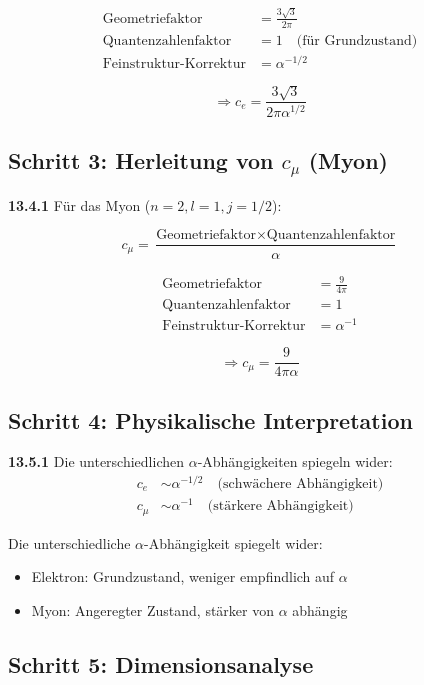 \begin{align*}
	\text{Geometriefaktor} &= \frac{3\sqrt{3}}{2\pi} \\
	\text{Quantenzahlenfaktor} &= 1 \quad \text{(für Grundzustand)} \\
	\text{Feinstruktur-Korrektur} &= \alpha^{-1/2}
\end{align*}

\[
\Rightarrow c_e = \frac{3\sqrt{3}}{2\pi\alpha^{1/2}}
\]

\subsection{Schritt 3: Herleitung von $c_\mu$ (Myon)}

\noindent \textbf{13.4.1} Für das Myon ($n=2, l=1, j=1/2$):

\[
c_\mu = \frac{\text{Geometriefaktor} \times \text{Quantenzahlenfaktor}}{\alpha}
\]

\begin{align*}
	\text{Geometriefaktor} &= \frac{9}{4\pi} \\
	\text{Quantenzahlenfaktor} &= 1 \\
	\text{Feinstruktur-Korrektur} &= \alpha^{-1}
\end{align*}

\[
\Rightarrow c_\mu = \frac{9}{4\pi\alpha}
\]

\subsection{Schritt 4: Physikalische Interpretation}

\noindent \textbf{13.5.1} Die unterschiedlichen $\alpha$-Abhängigkeiten spiegeln wider:
\begin{align*}
	c_e &\sim \alpha^{-1/2} \quad \text{(schwächere Abhängigkeit)} \\
	c_\mu &\sim \alpha^{-1} \quad \text{(stärkere Abhängigkeit)}
\end{align*}

Die unterschiedliche $\alpha$-Abhängigkeit spiegelt wider:
\begin{itemize}
	\item Elektron: Grundzustand, weniger empfindlich auf $\alpha$
	\item Myon: Angeregter Zustand, stärker von $\alpha$ abhängig
\end{itemize}

\subsection{Schritt 5: Dimensionsanalyse}

